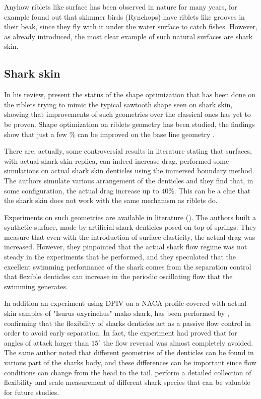 Anyhow riblets like surface has been observed in nature for many years, for example \citet{Martin2016riblets} found out that skimmer birds (Rynchops) have riblets like grooves in their beak, since they fly with it under the water surface to catch fishes.
However, as already introduced, the most clear example of such natural surfaces are shark skin.

\subsection{Shark skin}
In his review, \citet{dean2010shark} present the status of the shape optimization that has been done on the riblets trying to mimic the typical sawtooth shape seen on shark skin, showing that improvements of such geometries over the classical ones has yet to be proven.
Shape optimization on riblets geometry has been studied, the findings show that just a few $\%$ can be improved on the base line geometry \citet{bechert1997experiments}.

There are, actually, some controversial results in literature stating that surfaces, with actual shark skin replica, can indeed increase drag.
\citet{boomsma2016direct} performed some simulations on actual shark skin denticles using the immersed boundary method. The authors simulate various arrangement of the denticles and they find that, in some configuration, the actual drag increase up to $40\%$. This can be a clue that the shark skin does not work with the same mechanism as riblets do.

Experiments on such geometries are available in literature (\citet{bechert1997natural}).
The authors built a synthetic surface, made by artificial shark denticles posed on top of springs. They measure that even with the introduction of surface elasticity, the actual drag was increased.
However, they pinpointed that the actual shark flow regime was not steady in the experiments that he performed, and they speculated that the excellent swimming performance of the shark comes from the separation control that flexible denticles can increase in the periodic oscillating flow that the swimming generates.

In addition an experiment using DPIV on a NACA profile covered with actual skin samples of "Isurus oxyrinchus" mako shark, has been performed by \citet{lang2014SharkControl}, confirming that the flexibility of sharks denticles act as a passive flow control in order to avoid early separation.
In fact, the experiment had proved that for angles of attack larger than $15^{\circ}$ the flow reversal was almost completely avoided.
The same author noted that different geometries of the denticles can be found in various part of the sharks body, and these differences can be important since flow conditions can change from the head to the tail.
\citet{motta2012Shark} perform a detailed collection of flexibility and scale measurement of different shark species that can be valuable for future studies.

